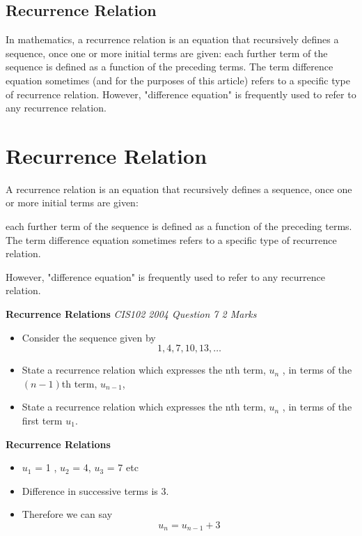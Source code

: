 \documentclass[12pt]{article}
\begin{document}
\subsection*{Recurrence Relation}
In mathematics, a recurrence relation is an equation that recursively defines a sequence, once one or more initial terms are given: each further term of the sequence is defined as a function of the preceding terms.
The term difference equation sometimes (and for the purposes of this article) refers to a specific type of recurrence relation. However, "difference equation" is frequently used to refer to any recurrence relation.



\section{Recurrence Relation}


A recurrence relation is an equation that recursively defines a sequence, once one or more initial terms are given: 

each further term of the sequence is defined as a function of the preceding terms.
The term difference equation sometimes refers to a specific type of recurrence relation. 

However, "difference equation" is frequently used to refer to any recurrence relation.




\noindent \textbf{Recurrence Relations}
\textit{CIS102 2004 Question 7 2 Marks}


\begin{itemize}
\item Consider the sequence given by \[ 1, 4, 7, 10, 13, \ldots\]
\item State a recurrence relation which expresses the nth term, $u_n$
, in terms of the$(n - 1)$th term, $u_{n-1}$, 
\item State a recurrence relation which expresses the nth term, $u_n$
, in terms of the first term $u_1$.
\end{itemize}



\noindent \textbf{Recurrence Relations}

\begin{itemize}
\item $u_1$ = 1 , $u_2$ = 4, $u_3$ = 7 etc 
\item Difference in successive terms is 3.
\item Therefore we can say 
\[ u_n = u_{n-1} + 3 \]
\end{itemize}
\end{document}

